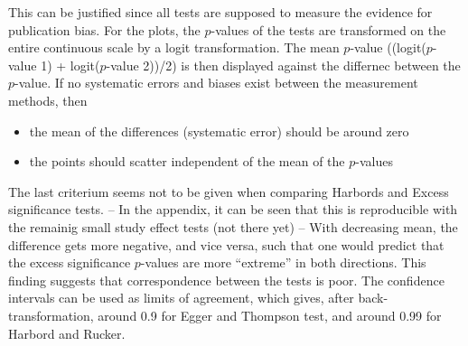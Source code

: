 \documentclass[11pt,a4paper,twoside]{book}\usepackage[]{graphicx}\usepackage[]{color}
\begin{document}
This can be justified since all tests are supposed to measure the evidence for publication bias. For the plots, the $p$-values of the tests are transformed on the entire continuous scale by a logit transformation. The mean $p$-value ((logit($p$-value 1) + logit($p$-value 2))/2) is then displayed against the differnec between the $p$-value. If no systematic errors and biases exist between the measurement methods, then 

\begin{itemize}
\item the mean of the differences (systematic error) should be around zero
\item the points should scatter independent of the mean of the $p$-values
\end{itemize}

The last criterium seems not to be given when comparing Harbords and Excess significance tests. 
-- In the appendix, it can be seen that this is reproducible with the remainig small study effect tests (not there yet) -- 
With decreasing mean, the difference gets more negative, and vice versa, such that one would predict that the excess significance $p$-values are more ``extreme'' in both directions. This finding suggests that correspondence between the tests is poor. The confidence intervals can be used as limits of agreement, which gives, after back-transformation, around 0.9 for Egger and Thompson test, and around 0.99 for Harbord and Rucker.
\end{document}
